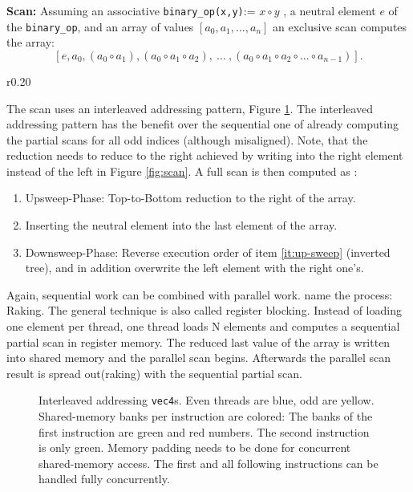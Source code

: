 \documentclass[m,times]{cgMA}
\begin{document}
\textbf{Scan:}  Assuming an associative \texttt{binary\_op(x,y)}:= $x \circ y$ , a neutral element $e$ of the \texttt{binary\_op}, and an array of values $\left[a_0,a_1, ... ,a_n\right]$ an exclusive scan computes the array:
\begin{equation}
  \left[e , a_0 , \left(a_0 \circ a_1\right), \left(a_0 \circ a_1 \circ a_2\right), \ ... \ ,\left(a_0\circ a_1 \circ a_2 \circ ...\circ a_{n-1}\right)\right].
\end{equation}
\begin{wrapfigure}[13]{r}{0.20\textwidth}
\vspace{-11}
 
 \caption{Scan (add)}
  \label{fig:scan}
\end{wrapfigure}
The scan uses an interleaved addressing pattern, Figure \ref{fig:interleaved}. The interleaved addressing pattern has the benefit over the sequential one of already computing the partial scans for all odd indices (although misaligned). Note, that the reduction needs to reduce to the right achieved by writing into the right element instead of the left in Figure \ref{fig:scan}. A full scan is then computed as \cite{NVIDIA:SCAN}:
\begin{enumerate}
  \item \label{it:up-sweep} Upsweep-Phase: Top-to-Bottom reduction to the right of the array.
  \item Inserting the neutral element into the last element of the array.
  \item Downsweep-Phase: Reverse execution order of item \ref{it:up-sweep} (inverted tree), and in addition overwrite the left element with the right one's.
\end{enumerate}
Again, sequential work can be combined with parallel work. \cite{NVIDIA:SCAN_MODERN} name the process: Raking. The general technique is also called register blocking. Instead of loading one element per thread, one thread loads N elements and computes a sequential partial scan in register memory. The reduced last value of the array is written into shared memory and the parallel scan begins. Afterwards the parallel scan result is spread out(raking) with the sequential partial scan.\cite{NVIDIA:SCAN_MODERN}
\begin{figure}[htbp]
  
  \caption{Interleaved addressing \texttt{vec4}s. Even threads are blue, odd are yellow. Shared-memory banks per instruction are colored: The banks of the first instruction are green and red numbers. The second instruction is only green. Memory padding needs to be done for concurrent shared-memory access. The first and all following instructions can be handled fully concurrently.}
\label{fig:interleaved}
\end{figure}
\end{document}

